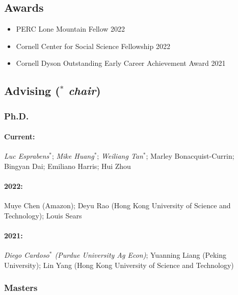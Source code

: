 \documentclass[11pt]{res} %
\begin{document}
\begin{resume}
\vspace{-.2in}

\subsection{Awards}
\begin{itemize}
	\item[] PERC Lone Mountain Fellow \hfill 2022
	\item[] Cornell Center for Social Science Fellowship \hfill 2022
	\item[] Cornell Dyson Outstanding Early Career Achievement Award \hfill 2021
\end{itemize}

\vspace{-.2in}

\subsection{Advising ($^*$ \textit{chair})  }
\vspace{-.2in}

\subsubsection{Ph.D.}\vspace{-.2in}
\paragraph{Current:} \textit{Luc Esprabens}$^*$; \textit{Mike Huang}$^*$; \textit{Weiliang Tan}$^*$; Marley Bonacquist-Currin; Bingyan Dai; Emiliano Harris; Hui Zhou
\vspace{-.4in}
\paragraph{2022:} Muye Chen (Amazon); Deyu Rao (Hong Kong University of Science and Technology); Louis Sears
\vspace{-.4in}
\paragraph{2021:} \textit{Diego Cardoso$^*$ (Purdue University Ag Econ)}; Yuanning Liang (Peking University); Lin Yang (Hong Kong University of Science and Technology)

\vspace{-.2in}

\subsubsection{Masters}\vspace{-.2in}

\end{resume}
\end{document}
